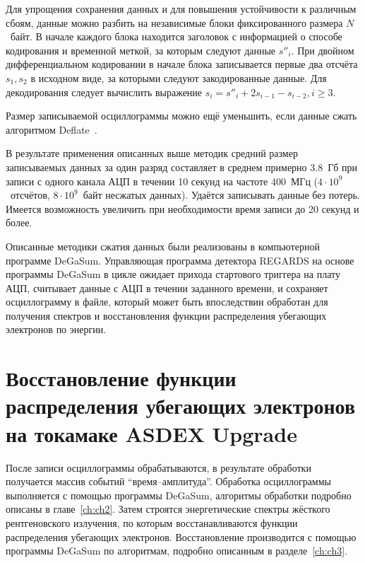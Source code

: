 Для упрощения сохранения данных и для повышения устойчивости к различным сбоям, данные можно разбить на независимые блоки фиксированного размера $N$~байт. В начале каждого блока находится заголовок с информацией о способе кодирования и временной меткой, за которым следуют данные $s''_i$. При двойном дифференциальном кодировании в начале блока записывается первые два отсчёта $s_1, s_2$ в исходном виде, за которыми следуют закодированные данные. Для декодирования следует вычислить выражение $s_i = s''_i + 2 s_{i-1} - s_{i-2}, i \ge 3$.~\cite{Khilkevich2019Dvp,Shevelev2021}

Размер записываемой осциллограммы можно ещё уменьшить, если данные сжать алгоритмом Deflate~\cite{RFC1951}. 

В результате применения описанных выше методик средний размер записываемых данных за один разряд составляет в среднем примерно 3.8~Гб при записи с одного канала АЦП в течении 10 секунд на частоте 400~МГц ($4\cdot10^9$~отсчётов, $8\cdot10^9$~байт несжатых данных). Удаётся записывать данные без потерь. Имеется возможность увеличить при необходимости время записи до 20 секунд и более.~\cite{Shevelev2021}

Описанные методики сжатия данных были реализованы в компьютерной программе DeGaSum. Управляющая программа детектора REGARDS на основе программы DeGaSum в цикле ожидает прихода стартового триггера на плату АЦП, считывает данные с АЦП в течении заданного времени, и сохраняет осциллограмму в файле, который может быть впоследствии обработан для получения спектров и восстановления функции распределения убегающих электронов по энергии.


\section{Восстановление функции распределения убегающих электронов на токамаке ASDEX Upgrade}

После записи осциллограммы обрабатываются, в результате обработки получается массив событий ``время--амплитуда''. Обработка осциллограммы выполняется с помощью программы DeGaSum, алгоритмы обработки подробно описаны в главе~\ref{ch:ch2}. Затем строятся энергетические спектры жёсткого рентгеновского излучения, по которым восстанавливаются функции распределения убегающих электронов. Восстановление производится с помощью программы DeGaSum по алгоритмам, подробно описанным в разделе~\ref{ch:ch3}.

